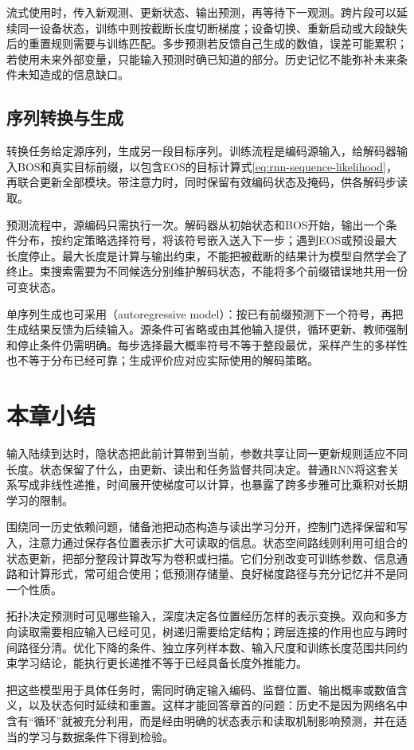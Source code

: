流式使用时，传入新观测、更新状态、输出预测，再等待下一观测。跨片段可以延续同一设备状态，训练中则按截断长度切断梯度；设备切换、重新启动或大段缺失后的重置规则需要与训练匹配。多步预测若反馈自己生成的数值，误差可能累积；若使用未来外部变量，只能输入预测时确已知道的部分。历史记忆不能弥补未来条件未知造成的信息缺口。

\subsection{序列转换与生成}
\label{sec:rnn-application-generation}

转换任务给定源序列，生成另一段目标序列。训练流程是编码源输入，给解码器输入BOS和真实目标前缀，以包含EOS的目标计算式\eqref{eq:rnn-sequence-likelihood}，再联合更新全部模块。带注意力时，同时保留有效编码状态及掩码，供各解码步读取。

预测流程中，源编码只需执行一次。解码器从初始状态和BOS开始，输出一个条件分布，按约定策略选择符号，将该符号嵌入送入下一步；遇到EOS或预设最大长度停止。最大长度是计算与输出约束，不能把被截断的结果计为模型自然学会了终止。束搜索需要为不同候选分别维护解码状态，不能将多个前缀错误地共用一份可变状态。

单序列生成也可采用（autoregressive model）：按已有前缀预测下一个符号，再把生成结果反馈为后续输入。源条件可省略或由其他输入提供，循环更新、教师强制和停止条件仍需明确。每步选择最大概率符号不等于整段最优，采样产生的多样性也不等于分布已经可靠；生成评价应对应实际使用的解码策略。

\Needspace{85mm}
\section{本章小结}
\label{sec:rnn-summary}

输入陆续到达时，隐状态把此前计算带到当前，参数共享让同一更新规则适应不同长度。状态保留了什么，由更新、读出和任务监督共同决定。普通RNN将这套关系写成非线性递推，时间展开使梯度可以计算，也暴露了跨多步雅可比乘积对长期学习的限制。

围绕同一历史依赖问题，储备池把动态构造与读出学习分开，控制门选择保留和写入，注意力通过保存各位置表示扩大可读取的信息。状态空间路线则利用可组合的状态更新，把部分整段计算改写为卷积或扫描。它们分别改变可训练参数、信息通路和计算形式，常可组合使用；低预测存储量、良好梯度路径与充分记忆并不是同一个性质。

拓扑决定预测时可见哪些输入，深度决定各位置经历怎样的表示变换。双向和多方向读取需要相应输入已经可见，树递归需要给定结构；跨层连接的作用也应与跨时间路径分清。优化下降的条件、独立序列样本数、输入尺度和训练长度范围共同约束学习结论，能执行更长递推不等于已经具备长度外推能力。

把这些模型用于具体任务时，需同时确定输入编码、监督位置、输出概率或数值含义，以及状态何时延续和重置。这样才能回答章首的问题：历史不是因为网络名中含有“循环”就被充分利用，而是经由明确的状态表示和读取机制影响预测，并在适当的学习与数据条件下得到检验。
